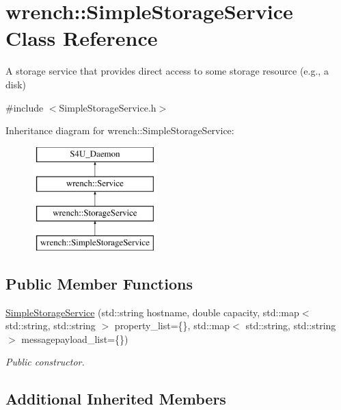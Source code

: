 \hypertarget{classwrench_1_1_simple_storage_service}{}\section{wrench\+:\+:Simple\+Storage\+Service Class Reference}
\label{classwrench_1_1_simple_storage_service}


A storage service that provides direct access to some storage resource (e.\+g., a disk)  




{\ttfamily \#include $<$Simple\+Storage\+Service.\+h$>$}

Inheritance diagram for wrench\+:\+:Simple\+Storage\+Service\+:\begin{figure}[H]
\begin{center}
\leavevmode
\includegraphics[height=4.000000cm]{classwrench_1_1_simple_storage_service}
\end{center}
\end{figure}
\subsection*{Public Member Functions}
\begin{DoxyCompactItemize}
\item 
\hyperlink{classwrench_1_1_simple_storage_service_a736cb5fb3b3d3a61c344cae0770616c4}{Simple\+Storage\+Service} (std\+::string hostname, double capacity, std\+::map$<$ std\+::string, std\+::string $>$ property\+\_\+list=\{\}, std\+::map$<$ std\+::string, std\+::string $>$ messagepayload\+\_\+list=\{\})
\begin{DoxyCompactList}\small\item\em Public constructor. \end{DoxyCompactList}\end{DoxyCompactItemize}
\subsection*{Additional Inherited Members}


